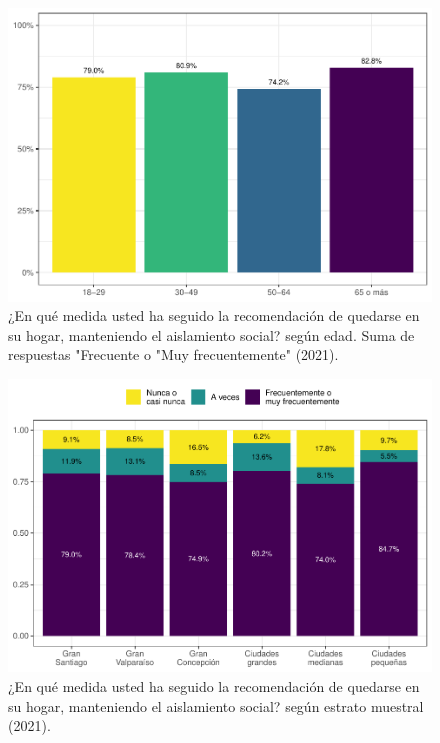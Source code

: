 \documentclass[
  12pt,
]{book}
\begin{document}
\begin{figure}

{\centering \includegraphics{reporte-elsoc_files/figure-latex/dist-edad-1} 

}

\caption{¿En qué medida usted ha seguido la recomendación de quedarse en su hogar, manteniendo el aislamiento social? según edad. Suma de respuestas "Frecuente o "Muy frecuentemente" (2021).}\label{fig:dist-edad}
\end{figure}

\begin{figure}

{\centering \includegraphics{reporte-elsoc_files/figure-latex/dist-estrato-1} 

}

\caption{¿En qué medida usted ha seguido la recomendación de quedarse en su hogar, manteniendo el aislamiento social? según estrato muestral (2021).}\label{fig:dist-estrato}
\end{figure}
\end{document}
